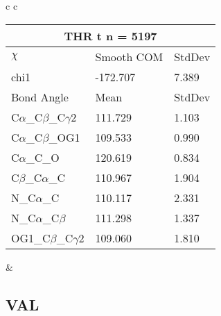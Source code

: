 \begin{longtable}{ c c }
\begin{tabular}{ l l l }
  \toprule
  \multicolumn{3}{c}{THR \textbf{t} n = 5197} \\ \toprule
  $\chi$       & Smooth COM & StdDev \\ \midrule
  chi1 & -172.707 & 7.389 \\ \midrule
  Bond Angle   & Mean     & StdDev \\ \midrule
  C$\alpha$\_C$\beta$\_C$\gamma$2 & 111.729 & 1.103\\
  C$\alpha$\_C$\beta$\_OG1 & 109.533 & 0.990\\
  C$\alpha$\_C\_O & 120.619 & 0.834\\
  C$\beta$\_C$\alpha$\_C & 110.967 & 1.904\\
  N\_C$\alpha$\_C & 110.117 & 2.331\\
  N\_C$\alpha$\_C$\beta$ & 111.298 & 1.337\\
  OG1\_C$\beta$\_C$\gamma$2 & 109.060 & 1.810\\
  \bottomrule
  \end{tabular}
  &
  \\
  
\end{longtable}    

\newpage
\subsection{VAL}

